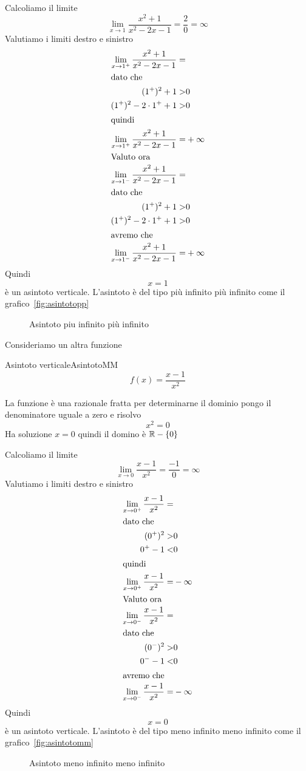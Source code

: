 Calcoliamo il limite\[\lim_{x\to 1}\dfrac{x^2+1}{x^2-2x-1}=\dfrac{2}{0}=\infty\]
Valutiamo i limiti destro e sinistro
\begin{align*}
\lim_{x\to 1^+}\dfrac{x^2+1}{x^2-2x-1}=&\\
\intertext{dato che}
(1^+)^2+1>&0\\
(1^+)^2 -2\cdot 1^+ +1>&0\\
\intertext{quindi}
\lim_{x\to 1^+}\dfrac{x^2+1}{x^2-2x-1}=&+\infty\\
\intertext{Valuto ora}
\lim_{x\to 1^-}\dfrac{x^2+1}{x^2-2x-1}=&\\
\intertext{dato che}
(1^+)^2+1>&0\\
(1^+)^2 -2\cdot 1^+ +1>&0\\
\intertext{avremo che}
\lim_{x\to 1^-}\dfrac{x^2+1}{x^2-2x-1}=&+\infty\\
\end{align*}
Quindi \[x=1\] è un asintoto verticale.
L'asintoto è del tipo più infinito più infinito come il grafico~\vref{fig:asintotopp}
\begin{figure}
	\centering
	
	\captionsetup{format=grafico}
	\caption[Asintoto più infinito più infinito]{Asintoto piu infinito più infinito}
	\label{fig:asintotopp}
\end{figure}

Consideriamo un altra  funzione
\begin{esempiot}{Asintoto verticale}{AsintotoMM}
	\[f(x)=\dfrac{x-1}{x^2} \]
\end{esempiot}
La funzione è una razionale fratta per determinarne il dominio pongo il denominatore uguale a zero e risolvo
\[x^2=0\]Ha soluzione $x=0$ quindi il domino è $\mathbb{R}-\lbrace0\rbrace$

Calcoliamo il limite\[\lim_{x\to 0}\dfrac{x-1}{x^2}=\dfrac{-1}{0}=\infty\]
Valutiamo i limiti destro e sinistro
\begin{align*}
\lim_{x\to 0^+}\dfrac{x-1}{x^2}=&\\
\intertext{dato che}
(0^+)^2>&0\\
0^+ -1<&0\\
\intertext{quindi}
\lim_{x\to 0^+}\dfrac{x-1}{x^2}=&-\infty\\
\intertext{Valuto ora}
\lim_{x\to 0^-}\dfrac{x-1}{x^2}=&\\
\intertext{dato che}
(0^-)^2>&0\\
0^- -1<&0\\
\intertext{avremo che}
\lim_{x\to 0^-}\dfrac{x-1}{x^2}=&-\infty\\
\end{align*}
Quindi \[x=0\] è un asintoto verticale.
L'asintoto è del tipo meno infinito meno infinito come il grafico~\vref{fig:asintotomm}
\begin{figure}
	\centering
	
	\captionsetup{format=grafico}
	\caption[Asintoto meno infinito meno infinito]{Asintoto meno infinito meno infinito}
	\label{fig:asintotomm}
\end{figure}

